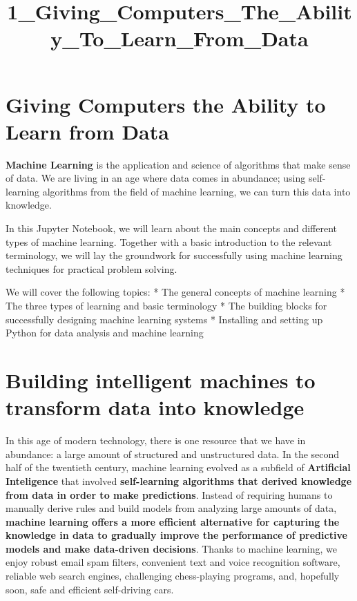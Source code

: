 \documentclass[11pt]{article}
\title{1\_Giving\_Computers\_The\_Ability\_To\_Learn\_From\_Data}
\begin{document}
    
    
    \maketitle
    
    

    
    \section{Giving Computers the Ability to Learn from
Data}\label{giving-computers-the-ability-to-learn-from-data}

    \textbf{Machine Learning} is the application and science of algorithms
that make sense of data. We are living in an age where data comes in
abundance; using self-learning algorithms from the field of machine
learning, we can turn this data into knowledge.

    In this Jupyter Notebook, we will learn about the main concepts and
different types of machine learning. Together with a basic introduction
to the relevant terminology, we will lay the groundwork for successfully
using machine learning techniques for practical problem solving.

    We will cover the following topics: * The general concepts of machine
learning * The three types of learning and basic terminology * The
building blocks for successfully designing machine learning systems *
Installing and setting up Python for data analysis and machine learning

    \section{Building intelligent machines to transform data into
knowledge}\label{building-intelligent-machines-to-transform-data-into-knowledge}

    In this age of modern technology, there is one resource that we have in
abundance: a large amount of structured and unstructured data. In the
second half of the twentieth century, machine learning evolved as a
subfield of \textbf{Artificial Inteligence} that involved
\textbf{self-learning algorithms that derived knowledge from data in
order to make predictions}. Instead of requiring humans to manually
derive rules and build models from analyzing large amounts of data,
\textbf{machine learning offers a more efficient alternative for
capturing the knowledge in data to gradually improve the performance of
predictive models and make data-driven decisions}. Thanks to machine
learning, we enjoy robust email spam filters, convenient text and voice
recognition software, reliable web search engines, challenging
chess-playing programs, and, hopefully soon, safe and efficient
self-driving cars.
\end{document}
